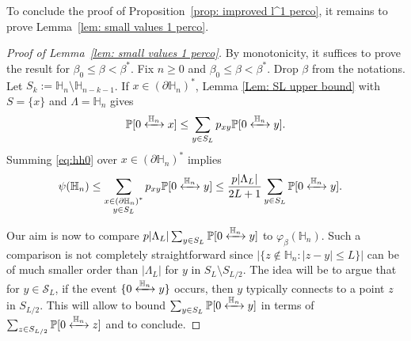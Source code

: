 \documentclass[11pt,a4paper]{article}
\numberwithin{equation}{section}
\theoremstyle{plain}
\theoremstyle{definition}
\newcommand{\connect}{\xleftrightarrow}
\begin{document}
To conclude the proof of Proposition~\ref{prop: improved l^1 perco}, it remains to prove Lemma~\ref{lem: small values 1 perco}.
\begin{proof}[Proof of Lemma~\textup{\ref{lem: small values 1 perco}}] By monotonicity, it suffices to prove the result for $\beta_0\leq \beta<\beta^*$. Fix $n\geq 0$ and $\beta_0\leq\beta<\beta^*$. Drop $\beta$ from the notations. Let $S_k:=\mathbb H_n\setminus\mathbb H_{n-k-1}$. If $x\in (\partial \mathbb H_n)^*$, Lemma \ref{Lem: SL upper bound} with $S=\{x\}$ and $\Lambda=\mathbb H_n$ gives
\begin{equation}\label{eq:hh0}
	\mathbb P[0\connect{\mathbb H_n\:}x]\leq \sum_{y\in S_L}p_{xy}\mathbb P[0\connect{\mathbb H_n\:}y].
\end{equation}
Summing \eqref{eq:hh0} over $x\in (\partial \mathbb H_n)^*$ implies
\begin{align}\label{eq:hha}
\psi(\mathbb H_n)&\le \sum_{\substack{x\in(\partial\mathbb H_n)^*\\ y\in S_L}}p_{xy}\mathbb P[0\connect{\mathbb H_n\:}y]\le \frac{p|\Lambda_L|}{2L+1}\sum_{y\in S_L}\mathbb P[0\connect{\mathbb H_n\:}y].
\end{align}

Our aim is now to compare $p|\Lambda_L|\sum_{y\in S_L}\mathbb P[0\connect{\mathbb H_n\:}y]$ to $\varphi_\beta(\mathbb H_n)$. Such a comparison is not completely straightforward since $|\{z\notin \mathbb H_n: |z-y|\leq L\}|$ can be of much smaller order than $|\Lambda_L|$ for $y$ in $S_L\setminus S_{L/2}$. The idea will be to argue that for $y\in \mathcal S_L$, if the event $\{0\connect{\mathbb H_n\:}y\}$ occurs, then $y$ typically connects to a point $z$ in $S_{L/2}$. This will allow to bound $\sum_{y\in S_L}\mathbb P[0\connect{\mathbb H_n\:}y]$ in terms of $\sum_{z\in S_{L/2}}\mathbb P[0\connect{\mathbb H_n\:}z]$ and to conclude.


\end{proof}
\end{document}
